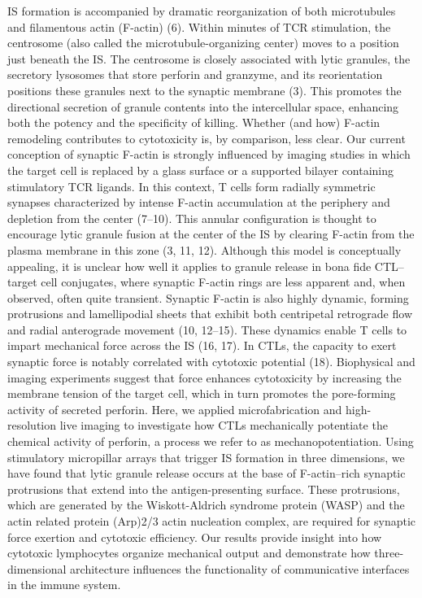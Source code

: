 IS formation is accompanied by dramatic reorganization of both microtubules and filamentous actin (F-actin) (6). Within minutes of TCR stimulation, the centrosome (also called the microtubule-organizing center) moves to a position just beneath the IS. The centrosome is closely associated with lytic granules, the secretory lysosomes that store perforin and granzyme, and its reorientation positions these granules next to the synaptic membrane (3). This promotes the directional secretion of granule contents into the intercellular space, enhancing both the potency and the specificity of killing. Whether (and how) F-actin remodeling contributes to cytotoxicity is, by comparison, less clear. Our current conception of synaptic F-actin is strongly influenced by imaging studies in which the target cell is replaced by a glass surface or a supported bilayer containing stimulatory TCR ligands. In this context, T cells form radially symmetric synapses characterized by intense F-actin accumulation at the periphery and depletion from the center (7–10). This annular configuration is thought to encourage lytic granule fusion at the center of the IS by clearing F-actin from the plasma membrane in this zone (3, 11, 12). Although this model is conceptually appealing, it is unclear how well it applies to granule release in bona fide CTL–target cell conjugates, where synaptic F-actin rings are less apparent and, when observed, often quite transient. Synaptic F-actin is also highly dynamic, forming protrusions and lamellipodial sheets that exhibit both centripetal retrograde flow and radial anterograde movement (10, 12–15). These dynamics enable T cells to impart mechanical force across the IS (16, 17). In CTLs, the capacity to exert synaptic force is notably correlated with cytotoxic potential (18). Biophysical and imaging experiments suggest that force enhances cytotoxicity by increasing the membrane tension of the target cell, which in turn promotes the pore-forming activity of secreted perforin. Here, we applied microfabrication and high-resolution live imaging to investigate how CTLs mechanically potentiate the chemical activity of perforin, a process we refer to as mechanopotentiation. Using stimulatory micropillar arrays that trigger IS formation in three dimensions, we have found that lytic granule release occurs at the base of F-actin–rich synaptic protrusions that extend into the antigen-presenting surface. These protrusions, which are generated by the Wiskott-Aldrich syndrome protein (WASP) and the actin related protein (Arp)2/3 actin nucleation complex, are required for synaptic force exertion and cytotoxic efficiency. Our results provide insight into how cytotoxic lymphocytes organize mechanical output and demonstrate how three-dimensional architecture influences the functionality of communicative interfaces in the immune system.

